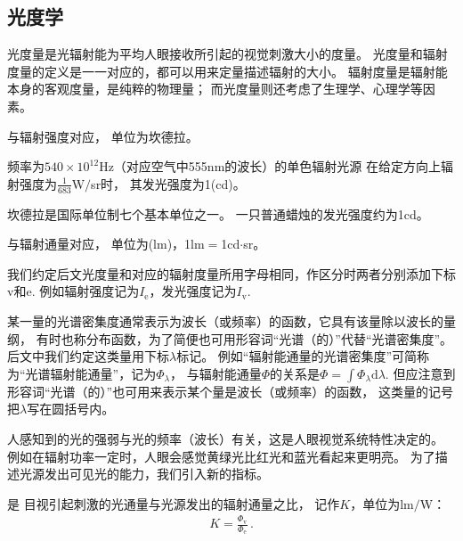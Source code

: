 \subsection{光度学}\label{sub:光度学}
光度量是光辐射能为平均人眼接收所引起的视觉刺激大小的度量。
光度量和辐射度量的定义是一一对应的，都可以用来定量描述辐射的大小。
辐射度量是辐射能本身的客观度量，是纯粹的物理量；
而光度量则还考虑了生理学、心理学等因素。

与辐射强度对应，
单位为坎德拉。
\begin{definition}
      频率为$540\times10^{12}\text{Hz}$（对应空气中555nm的波长）的单色辐射光源
      在给定方向上辐射强度为$\displaystyle\frac{1}{683}$W$/$sr时，
      其发光强度为1(cd)。
\end{definition}
坎德拉是国际单位制七个基本单位之一。
一只普通蜡烛的发光强度约为1cd。

与辐射通量对应，
单位为(lm)，1lm$=$1cd$\cdot$sr。

\begin{notation}
      我们约定后文光度量和对应的辐射度量所用字母相同，作区分时两者分别添加下标$\mathrm{v}$和$\mathrm{e}$.
      例如辐射强度记为$I_{\mathrm{e}}$，发光强度记为$I_{\mathrm{v}}$.
\end{notation}

\begin{notation}
      某一量的光谱密集度通常表示为波长（或频率）的函数，它具有该量除以波长的量纲，
      有时也称分布函数，为了简便也可用形容词“光谱（的）”代替“光谱密集度”。
      后文中我们约定这类量用下标$\lambda$标记。
      例如“辐射能通量的光谱密集度”可简称为“光谱辐射能通量”，记为$\varPhi_{\lambda}$，
      与辐射能通量$\varPhi$的关系是$\displaystyle\varPhi=\int \varPhi_{\lambda}\mathrm{d}\lambda$.
      但应注意到形容词“光谱（的）”也可用来表示某个量是波长（或频率）的函数，
      这类量的记号把$\lambda$写在圆括号内。
\end{notation}

人感知到的光的强弱与光的频率（波长）有关，这是人眼视觉系统特性决定的。
例如在辐射功率一定时，人眼会感觉黄绿光比红光和蓝光看起来更明亮。
为了描述光源发出可见光的能力，我们引入新的指标。

\begin{definition}
      是
      目视引起刺激的光通量与光源发出的辐射通量之比，
      记作$K$，单位为lm$/$W：
      \begin{align}
            K=\frac{\varPhi_{\mathrm{v}}}{\varPhi_{\mathrm{e}}}\, .
      \end{align}
\end{definition}

